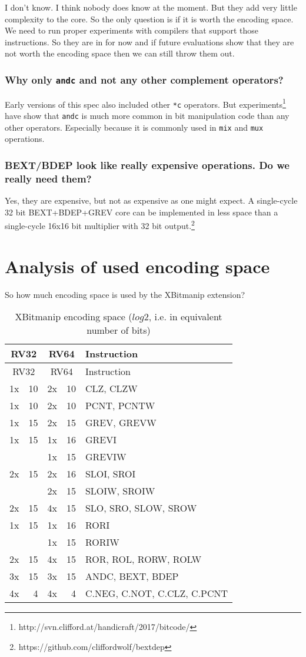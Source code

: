 I don't know. I think nobody does know at the moment. But they add very little
complexity to the core. So the only question is if it is worth the encoding
space. We need to run proper experiments with compilers that support those
instructions. So they are in for now and if future evaluations show that they
are not worth the encoding space then we can still throw them out.

\subsubsection{Why only \texttt{andc} and not any other complement operators?}

Early versions of this spec also included other \texttt{*c} operators. But
experiments\footnote{http://svn.clifford.at/handicraft/2017/bitcode/} have show that
\texttt{andc} is much more common in bit manipulation code than any other operators.
Especially because it is commonly used in \texttt{mix} and \texttt{mux} operations.

\subsubsection{BEXT/BDEP look like really expensive operations. Do we really need them?}

Yes, they are expensive, but not as expensive as one might expect. A
single-cycle 32 bit BEXT+BDEP+GREV core can be implemented in less space than a
single-cycle 16x16 bit multiplier with 32 bit output.\footnote{https://github.com/cliffordwolf/bextdep}

\section{Analysis of used encoding space}

So how much encoding space is used by the XBitmanip extension?

\begin{longtable}[c]{@{}rr|rr|l@{}}
\caption{XBitmanip encoding space ($log2$, i.e. in equivalent number of bits)}\tabularnewline
\toprule
\multicolumn{2}{c}{RV32} & \multicolumn{2}{c}{RV64} & Instruction\tabularnewline
\midrule
\endfirsthead
\toprule
\multicolumn{2}{c}{RV32} & \multicolumn{2}{c}{RV64} & Instruction\tabularnewline
\midrule
\endhead
1x & 10 & 2x & 10 & CLZ, CLZW\tabularnewline
1x & 10 & 2x & 10 & PCNT, PCNTW\tabularnewline
\midrule
1x & 15 & 2x & 15 & GREV, GREVW\tabularnewline
1x & 15 & 1x & 16 & GREVI\tabularnewline
   &    & 1x & 15 & GREVIW\tabularnewline
\midrule
2x & 15 & 2x & 16 & SLOI, SROI\tabularnewline
   &    & 2x & 15 & SLOIW, SROIW\tabularnewline
2x & 15 & 4x & 15 & SLO, SRO, SLOW, SROW\tabularnewline
\midrule
1x & 15 & 1x & 16 & RORI\tabularnewline
   &    & 1x & 15 & RORIW\tabularnewline
2x & 15 & 4x & 15 & ROR, ROL, RORW, ROLW\tabularnewline
\midrule
3x & 15 & 3x & 15 & ANDC, BEXT, BDEP\tabularnewline
\midrule
4x &  4 & 4x &  4 & C.NEG, C.NOT, C.CLZ, C.PCNT\tabularnewline
\bottomrule
\end{longtable}

